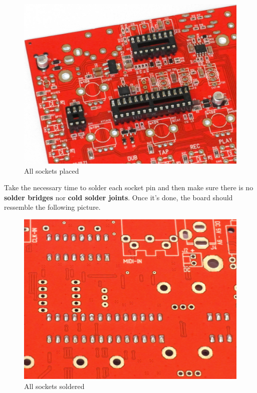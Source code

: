 \documentclass{scrartcl}
\begin{document}
\begin{figure}[!ht]
    \begin{center}
        \includegraphics[scale=0.28]{assets/pcb-sockets.jpg}
        \caption{All sockets placed}
    \end{center}
\end{figure}
Take the necessary time to solder each socket pin and then make sure there is no \textbf{solder bridges} nor \textbf{cold solder joints}. Once it's done, the board should ressemble the following picture.

\begin{figure}[!ht]
    \begin{center}
        \includegraphics[scale=0.20]{assets/ic-solder.jpg}
        \caption{All sockets soldered}
    \end{center}
\end{figure}
\end{document}
